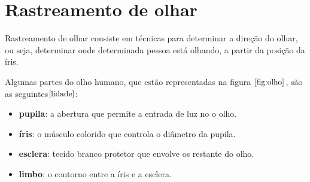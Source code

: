 \chapter{Rastreamento de olhar}

Rastreamento de olhar consiste em técnicas para determinar a direção do olhar, ou seja, determinar onde determinada pessoa está olhando, a partir da posição da íris.

Algumas partes do olho humano, que estão representadas na figura $\ref{fig:olho}$,  são as seguintes$\cite{lidade}$:


\begin{itemize}

\item \textbf{pupila}: a abertura que permite a entrada de luz no o olho.
\item \textbf{íris}: o músculo colorido que controla o diâmetro da pupila.
\item \textbf{esclera}: tecido branco protetor que envolve os restante do olho.
\item \textbf{limbo}: o contorno entre a íris e a esclera.
\end{itemize}


